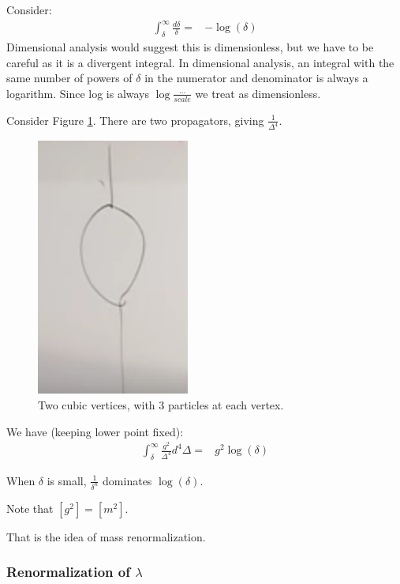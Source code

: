 \documentclass[]{article}
\begin{document}
Consider:
\begin{align*}
	\int_{\delta}^{\infty} \frac{d \delta}{\delta} =& - \log(\delta)
\end{align*}
Dimensional analysis would suggest this is dimensionless, but we have to be careful as it is a divergent integral. In dimensional analysis, an integral with  the same number of powers of $\delta$ in the numerator and denominator is always a logarithm. Since log is always $\log\frac{...}{scale}$ we treat as dimensionless.

Consider Figure \ref{fig:particles3-1-two-cubic-vertices}. There are two propagators, giving $\frac{1}{\Delta^4}$.
\begin{figure}[H]
	\begin{center}
		\caption{Two cubic vertices, with 3 particles at each vertex.}\label{fig:particles3-1-two-cubic-vertices}
		\includegraphics{particles3-1-two-cubic-vertices}
	\end{center}
\end{figure}

We have (keeping lower point fixed):
\begin{align*}
	\int_{\delta}^{\infty} \frac{g^2}{\Delta^4} d^4 \Delta =& g^2 \log(\delta)
\end{align*}

When $\delta$ is small, $\frac{1}{\delta^n}$ dominates $\log(\delta)$.

Note that $[g^2] = [m^2]$.

That is the idea of mass renormalization.

\subsubsection{Renormalization of $\lambda$}
\end{document}
